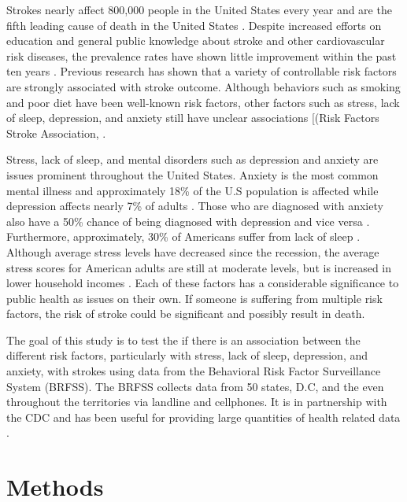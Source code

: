 \documentclass[11pt,]{article}
\begin{document}
Strokes nearly affect 800,000 people in the United States every year and
are the fifth leading cause of death in the United States
\citep{AmericanStrokeAssociation2017}. Despite increased efforts on
education and general public knowledge about stroke and other
cardiovascular risk diseases, the prevalence rates have shown little
improvement within the past ten years \citep{Mozaffarian2015}. Previous
research has shown that a variety of controllable risk factors are
strongly associated with stroke outcome. Although behaviors such as
smoking and poor diet have been well-known risk factors, other factors
such as stress, lack of sleep, depression, and anxiety still have
unclear associations {[}(Risk Factors Stroke Association,
\citep{AmericanStrokeAssociation2017a}.

Stress, lack of sleep, and mental disorders such as depression and
anxiety are issues prominent throughout the United States. Anxiety is
the most common mental illness and approximately 18\% of the U.S
population is affected while depression affects nearly 7\% of adults
\citep{AnxietyandDepressionAssociationofAmerica2017}. Those who are
diagnosed with anxiety also have a 50\% chance of being diagnosed with
depression and vice versa
\citep{AnxietyandDepressionAssociationofAmerica2017}. Furthermore,
approximately, 30\% of Americans suffer from lack of sleep
\citep{CentersforDiseaseControlandPrevention2015}. Although average
stress levels have decreased since the recession, the average stress
scores for American adults are still at moderate levels, but is
increased in lower household incomes
\citep{AmericanPsychologicalAssociation2015}. Each of these factors has
a considerable significance to public health as issues on their own. If
someone is suffering from multiple risk factors, the risk of stroke
could be significant and possibly result in death.

The goal of this study is to test the if there is an association between
the different risk factors, particularly with stress, lack of sleep,
depression, and anxiety, with strokes using data from the Behavioral
Risk Factor Surveillance System (BRFSS). The BRFSS collects data from 50
states, D.C, and the even throughout the territories via landline and
cellphones. It is in partnership with the CDC and has been useful for
providing large quantities of health related data
\citep{CentersforDiseaseControlandPrevention2014}.

\section{Methods}\label{methods}
\end{document}

